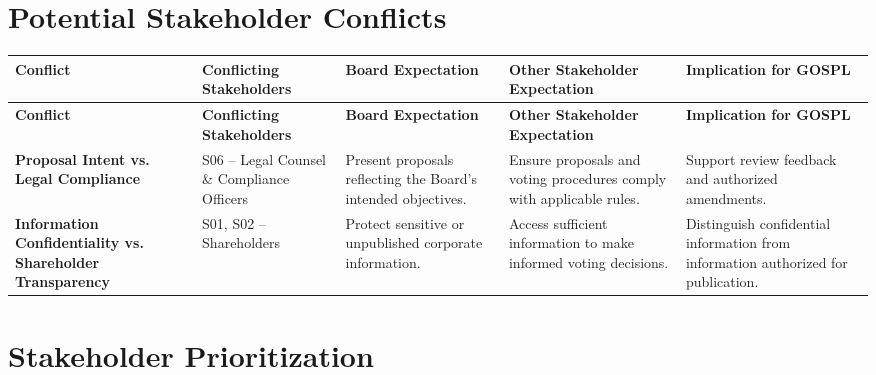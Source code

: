 \documentclass[11pt,a4paper]{article}
\begin{document}

\section*{Potential Stakeholder Conflicts}

\begingroup\small
\begin{longtable}{@{}>{\raggedright\arraybackslash}p{}>{\raggedright\arraybackslash}p{}>{\raggedright\arraybackslash}p{}>{\raggedright\arraybackslash}p{}>{\raggedright\arraybackslash}p{}@{}}
\toprule
\textbf{Conflict} & \textbf{Conflicting Stakeholders} & \textbf{Board Expectation} & \textbf{Other Stakeholder Expectation} & \textbf{Implication for GOSPL} \\
\midrule
\endfirsthead
\toprule
\textbf{Conflict} & \textbf{Conflicting Stakeholders} & \textbf{Board Expectation} & \textbf{Other Stakeholder Expectation} & \textbf{Implication for GOSPL} \\
\midrule
\endhead
\bottomrule
\endfoot
\textbf{Proposal Intent vs. Legal Compliance} & S06 -- Legal Counsel \& Compliance Officers & Present proposals reflecting the Board's intended objectives. & Ensure proposals and voting procedures comply with applicable rules. & Support review feedback and authorized amendments. \\
\addlinespace
\textbf{Information Confidentiality vs. Shareholder Transparency} & S01, S02 -- Shareholders & Protect sensitive or unpublished corporate information. & Access sufficient information to make informed voting decisions. & Distinguish confidential information from information authorized for publication. \\
\end{longtable}
\endgroup


\section*{Stakeholder Prioritization}
\end{document}
